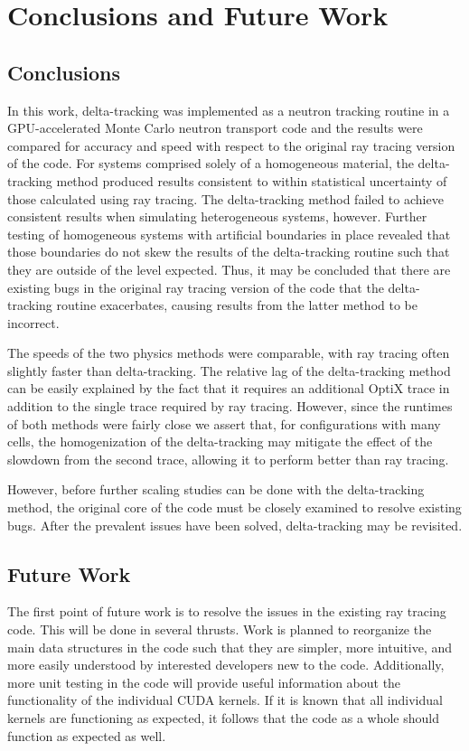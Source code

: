 \chapter{Conclusions and Future Work}

\section{Conclusions}

In this work, delta-tracking was implemented as a neutron tracking routine in a GPU-accelerated Monte
Carlo neutron transport code and the results were compared for accuracy and speed with respect to the 
original ray tracing version of the code. For systems comprised solely of a homogeneous material, the
delta-tracking method produced results consistent to within statistical uncertainty of those calculated
using ray tracing. The delta-tracking method failed to achieve consistent results when simulating
heterogeneous systems, however. Further testing of homogeneous systems with artificial boundaries in 
place revealed that those boundaries do not skew the results of the delta-tracking routine such that they
are outside of the level expected. Thus, it may be concluded that there are existing bugs in the
original ray tracing version of the code that the delta-tracking routine exacerbates, causing results
from the latter method to be incorrect.

The speeds of the two physics methods were comparable, with ray tracing often slightly faster than 
delta-tracking. The relative lag of the delta-tracking method can be easily explained by the fact that it
requires an additional OptiX trace in addition to the single trace required by ray tracing. However, since
 the runtimes of both methods were fairly close we assert that, for configurations with many cells, the
homogenization of the delta-tracking may mitigate the effect of the slowdown from the second trace, 
allowing it to perform better than ray tracing.

However, before further scaling studies can be done with the delta-tracking method, the original core of
the code must be closely examined to resolve existing bugs. After the prevalent issues have been solved,
delta-tracking may be revisited.

\section{Future Work}

The first point of future work is to resolve the issues in the existing ray tracing code. This will be
done in several thrusts. Work is planned to reorganize the main data structures in the code such that
they are simpler, more intuitive, and more easily understood by interested developers new to the code.
Additionally, more unit testing in the code will provide useful information about the functionality of the individual CUDA kernels. If it is known that all individual kernels are functioning as expected, it 
follows that the code as a whole should function as expected as well.

